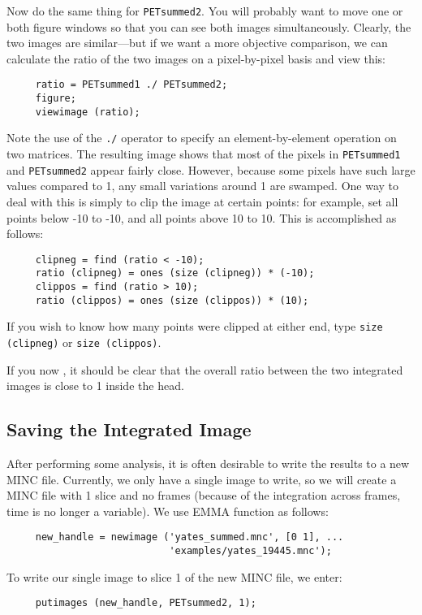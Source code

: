 Now do the same thing for \verb|PETsummed2|.  You will probably want
to move one or both figure windows so that you can see both images
simultaneously.  Clearly, the two images are similar---but if we want
a more objective comparison, we can calculate the ratio of the two
images on a pixel-by-pixel basis and view this:
\begin{verbatim}
     ratio = PETsummed1 ./ PETsummed2;
     figure;
     viewimage (ratio);
\end{verbatim}

Note the use of the \verb|./| operator to specify an
element-by-element operation on two matrices.  The resulting image
shows that most of the pixels in \verb|PETsummed1| and
\verb|PETsummed2| appear fairly close.  However, because some pixels
have such large values compared to 1, any small variations around 1
are swamped.  One way to deal with this is simply to clip the image
at certain points: for example, set all points below -10 to -10, and
all points above 10 to 10.  This is accomplished as follows:
\begin{verbatim}
     clipneg = find (ratio < -10);
     ratio (clipneg) = ones (size (clipneg)) * (-10);
     clippos = find (ratio > 10);
     ratio (clippos) = ones (size (clippos)) * (10);
\end{verbatim}

If you wish to know how many points were clipped at either end,
type \verb|size (clipneg)| or \verb|size (clippos)|.

If you now , it should be clear that the
overall ratio between the two integrated images is close to 1 inside
the head.

\subsection{Saving the Integrated Image}

After performing some analysis, it is often desirable to write the
results to a new MINC file.  Currently, we only have a single image to
write, so we will create a MINC file with 1 slice and no frames
(because of the integration across frames, time is no longer a
variable).  We use EMMA function  as follows:
\begin{verbatim}
     new_handle = newimage ('yates_summed.mnc', [0 1], ...
                            'examples/yates_19445.mnc');
\end{verbatim}
To write our single image to slice 1 of the new MINC file, we enter:
\begin{verbatim}
     putimages (new_handle, PETsummed2, 1);
\end{verbatim}


